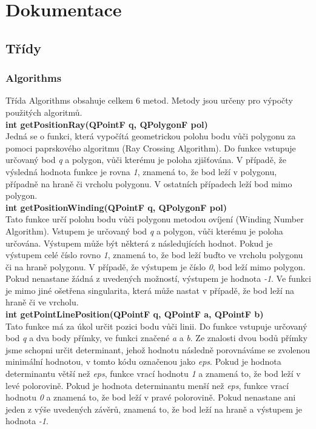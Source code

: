 \documentclass[a4paper, 12pt]{article}
\begin{document}
\clearpage

\section{Dokumentace}
\subsection{Třídy}
\subsubsection{Algorithms}
Třída Algorithms obsahuje celkem 6 metod. Metody jsou určeny pro výpočty použitých algoritmů.
\\

\textbf{int getPositionRay(QPointF q, QPolygonF pol)}\\
Jedná se o funkci, která vypočítá geometrickou polohu bodu vůči polygonu za pomoci paprskového algoritmu (Ray Crossing Algorithm). Do funkce vstupuje určovaný bod \textit{q} a polygon, vůči kterému je poloha zjišťována. V případě, že výsledná hodnota funkce je rovna \textit{1}, znamená to, že bod leží v polygonu, případně na hraně či vrcholu polygonu. V ostatních případech leží bod mimo polygon.\\

\textbf{int getPositionWinding(QPointF q, QPolygonF pol)}\\
Tato funkce určí polohu bodu vůči polygonu metodou ovíjení (Winding Number Algorithm). Vstupem je určovaný bod \textit{q} a polygon, vůči kterému je poloha určována. Výstupem může být některá z následujících hodnot. Pokud je výstupem celé číslo rovno \textit{1}, znamená to, že bod leží buďto ve vrcholu polygonu či na hraně polygonu. V případě, že výstupem je číslo \textit{0}, bod leží mimo polygon. Pokud nenastane žádná z uvedených možností, výstupem je hodnota \textit{-1}. Ve funkci je mimo jiné ošetřena singularita, která může nastat v případě, že bod leží na hraně či ve vrcholu.\\

\textbf{int getPointLinePosition(QPointF q, QPointF a, QPointF b)}\\
Tato funkce má za úkol určit pozici bodu vůči linii. Do funkce vstupuje určovaný bod \textit{q} a dva body přímky, ve funkci značené \textit{a} a \textit{b}. Ze znalosti dvou bodů přímky jsme schopni určit determinant, jehož hodnotu následně porovnáváme se zvolenou minimální hodnotou, v tomto kódu označenou jako \textit{eps}. Pokud je hodnota determinantu větší než \textit{eps}, funkce vrací hodnotu \textit{1} a znamená to, že bod leží v levé polorovině. Pokud je hodnota determinantu menší než \textit{eps}, funkce vrací hodnotu \textit{0} a znamená to, že bod leží v pravé polorovině. Pokud nenastane ani jeden z výše uvedených závěrů, znamená to, že bod leží na hraně a výstupem je hodnota \textit{-1}.\\
\end{document}
